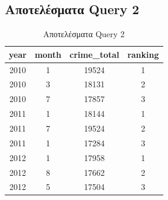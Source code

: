 \documentclass[12pt, a4paper]{article}
\begin{document}
\subsection*{Αποτελέσματα Query 2}




\begin{table}[h!]
\centering
\begin{tabular}{cccc} 
\hline
year & month & crime\_total & ranking \\ 
\hline
2010 & 1 & 19524 & 1 \\
2010 & 3 & 18131 & 2 \\
2010 & 7 & 17857 & 3 \\
2011 & 1 & 18144 & 1 \\
2011 & 7 & 19524 & 2 \\
2011 & 1 & 17284 & 3 \\
2012 & 1 & 17958 & 1 \\
2012 & 8 & 17662 & 2 \\
2012 & 5 & 17504 & 3 \\
\hline
\end{tabular}
\caption{Αποτελέσματα Query 2}
\label{q2_results_all}
\end{table}
\end{document}

